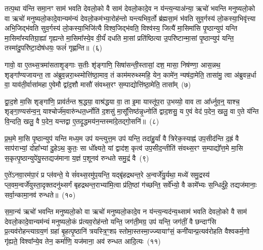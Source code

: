 {%
तत्प॒था य॑न्ति समा॒नꣳ साम॑ भवति देवलो॒को वै साम॑ देवलो॒कादे॒व न य॑न्त्य॒न्याअ॑न्या॒ ऋचो॑ भवन्ति मनुष्यलो॒को वा ऋचो॑ मनुष्यलो॒कादे॒वान्यम॑न्यं देवलो॒कम॑भ्या॒रोह॑न्तो यन्त्यभिव॒र्तो ब्र॑ह्मसा॒मं भ॑वति सुव॒र्गस्य॑ लो॒कस्या॒भिवृ॑त्त्या अभि॒जिद्भ॑वति सुव॒र्गस्य॑ लो॒कस्या॒भिजि॑त्यै विश्व॒जिद्भ॑वति॒ विश्व॑स्य॒ जित्यै॑ मा॒सिमा॑सि पृ॒ष्ठान्युप॑ यन्ति मा॒सिमा᳚स्यतिग्रा॒ह्या॑ गृह्यन्ते मा॒सिमा᳚स्ये॒व वी॒र्यं॑ दधति मा॒सां प्रति॑ष्ठित्या उ॒परि॑ष्टान्मा॒सां पृ॒ष्ठान्युप॑ यन्ति॒ तस्मा॑दु॒परि॑ष्टा॒दोष॑धयः॒ फलं॑ गृह्णन्ति॥~(६)

{\anuvakamend[{गो॒स॒त्रं वा ए॑ति संवथ्स॒रो᳚\-ऽर्धमा॒सा मि॑थु॒नं म॑ध्य॒तो दे॑व॒याने॑नै॒व वी॒र्य॑न्त्रयो॑दश च}]}%

गावो॒ वा ए॒तथ्स॒त्रमा॑सताशृ॒ङ्गाः स॒तीः शृ॑ङ्गाणि॒ सिषा॑सन्ती॒स्तासां॒ दश॒ मासा॒ निष॑ण्णा॒ आस॒न्नथ॒ शृङ्गा᳚ण्यजायन्त॒ ता अ॑ब्रुव॒न्नरा॒थ्स्मोत्ति॑ष्ठा॒माव॒ तं काम॑मरुथ्स्महि॒ येन॒ कामे॑न॒ न्यष॑दा॒मेति॒ तासा॑मु॒ त्वा अ॑ब्रुवन्न॒र्धा वा॒ याव॑ती॒र्वासा॑महा ए॒वेमौ द्वा॑द॒शौ मासौ॑ संवथ्स॒रꣳ स॒म्पाद्योत्ति॑ष्ठा॒मेति॒ तासा᳚म्~(७)

द्वा॒द॒शे मा॒सि शृङ्गा॑णि॒ प्राव॑र्तन्त श्र॒द्धया॒ वाश्र॑द्धया वा॒ ता इ॒मा यास्तू॑प॒रा उ॒भय्यो॒ वाव ता आ᳚र्ध्नुव॒न्॒ याश्च॒ शृङ्गा॒ण्यस॑न्व॒न्॒ याश्चोर्ज॑म॒वारु॑न्धत॒र्ध्नोति॑ द॒शसु॑ मा॒सू᳚त्तिष्ठ॑न्नृ॒ध्नोति॑ द्वाद॒शसु॒ य ए॒वं वेद॑ प॒देन॒ खलु॒ वा ए॒ते य॑न्ति वि॒न्दति॒ खलु॒ वै प॒देन॒ यन्तद्वा ए॒तदृ॒द्धमय॑न॒न्तस्मा॑दे॒तद्गो॒सनि॑॥~(८)

{\anuvakamend[{ति॒ष्ठा॒मेति॒ तासा॒न्तस्मा॒द्द्वे च॑}]}%

प्र॒थ॒मे मा॒सि पृ॒ष्ठान्युप॑ यन्ति मध्य॒म उप॑ यन्त्युत्त॒म उप॑ यन्ति॒ तदा॑हु॒र्यां वै त्रिरेक॒स्याह्न॑ उप॒सीद॑न्ति द॒ह्रं वै साप॑राभ्यां॒ दोहा᳚भ्यां दु॒हे\-ऽथ॒ कुतः॒ सा धो᳚क्ष्यते॒ यां द्वाद॑श॒ कृत्व॑ उप॒सीद॒न्तीति॑ संवथ्स॒रꣳ स॒म्पाद्यो᳚त्त॒मे मा॒सि स॒कृत्पृ॒ष्ठान्युपे॑यु॒स्तद्यज॑माना य॒ज्ञं प॒शूनव॑ रुन्धते समु॒द्रं वै~(९)

ए॒ते॑\-ऽनवा॒रम॑पा॒रं प्र प्ल॑वन्ते॒ ये सं॑वथ्स॒रमु॑प॒यन्ति॒ यद्बृ॑हद्रथन्त॒रे अ॒न्वर्जे॑यु॒र्यथा॒ मध्ये॑ समु॒द्रस्य॑ प्ल॒वम॒न्वर्जे॑युस्ता॒दृक्त\-दनु॑थ्सर्गं बृहद्रथन्त॒राभ्या॑मि॒त्वा प्र॑ति॒ष्ठां ग॑च्छन्ति॒ सर्वे᳚भ्यो॒ वै कामे᳚भ्यः स॒न्धिर्दु॑हे॒ तद्यज॑मानाः॒ सर्वा॒न्कामा॒नव॑ रुन्धते॥~(१०)

{\anuvakamend[{स॒मु॒द्रं वै चतु॑स्त्रिꣳशच्च}]}%

स॒मा॒न्य॑ ऋचो॑ भवन्ति मनुष्यलो॒को वा ऋचो॑ मनुष्यलो॒कादे॒व न य॑न्त्य॒न्यद॑न्य॒थ्साम॑ भवति देवलो॒को वै साम॑ देवलो॒कादे॒वान्यम॑न्यं मनुष्यलो॒कं प्र॑त्यव॒रोह॑न्तो यन्ति॒ जग॑ती॒मग्र॒ उप॑ यन्ति॒ जग॑तीं॒ वै छन्दाꣳ॑सि प्र॒त्यव॑रोहन्त्याग्रय॒णं ग्रहा॑ बृ॒हत्पृ॒ष्ठानि॑ त्रयस्त्रि॒ꣳ॒शꣴ स्तोमा॒स्तस्मा॒ज्ज्यायाꣳ॑सं॒ कनी॑यान्प्र॒त्यव॑रोहति वैश्वकर्म॒णो गृ॑ह्यते॒ विश्वा᳚न्ये॒व तेन॒ कर्मा॑णि॒ यज॑माना॒ अव॑ रुन्धत आदि॒त्यः~(११)

}
